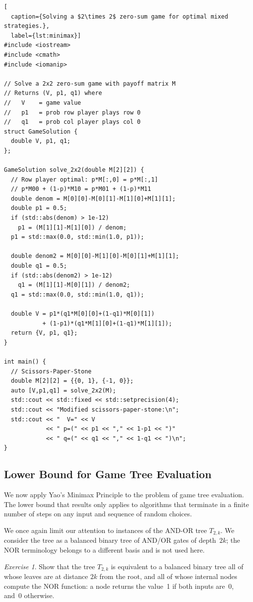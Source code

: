 \documentclass[twoside,12pt]{book}
\theoremstyle{plain}
\theoremstyle{definition}
\theoremstyle{remark}
\newtheorem{exercise}[theorem]{Exercise}
\begin{document}
\begin{lstlisting}[
  caption={Solving a $2\times 2$ zero-sum game for optimal mixed strategies.},
  label={lst:minimax}]
#include <iostream>
#include <cmath>
#include <iomanip>

// Solve a 2x2 zero-sum game with payoff matrix M
// Returns (V, p1, q1) where
//   V    = game value
//   p1   = prob row player plays row 0
//   q1   = prob col player plays col 0
struct GameSolution {
  double V, p1, q1;
};

GameSolution solve_2x2(double M[2][2]) {
  // Row player optimal: p*M[:,0] = p*M[:,1]
  // p*M00 + (1-p)*M10 = p*M01 + (1-p)*M11
  double denom = M[0][0]-M[0][1]-M[1][0]+M[1][1];
  double p1 = 0.5;
  if (std::abs(denom) > 1e-12)
    p1 = (M[1][1]-M[1][0]) / denom;
  p1 = std::max(0.0, std::min(1.0, p1));

  double denom2 = M[0][0]-M[1][0]-M[0][1]+M[1][1];
  double q1 = 0.5;
  if (std::abs(denom2) > 1e-12)
    q1 = (M[1][1]-M[0][1]) / denom2;
  q1 = std::max(0.0, std::min(1.0, q1));

  double V = p1*(q1*M[0][0]+(1-q1)*M[0][1])
           + (1-p1)*(q1*M[1][0]+(1-q1)*M[1][1]);
  return {V, p1, q1};
}

int main() {
  // Scissors-Paper-Stone
  double M[2][2] = {{0, 1}, {-1, 0}};
  auto [V,p1,q1] = solve_2x2(M);
  std::cout << std::fixed << std::setprecision(4);
  std::cout << "Modified scissors-paper-stone:\n";
  std::cout << "  V=" << V
            << " p=(" << p1 << "," << 1-p1 << ")"
            << " q=(" << q1 << "," << 1-q1 << ")\n";
}
\end{lstlisting}

\subsection{Lower Bound for Game Tree Evaluation}

We now apply Yao's Minimax Principle to the problem of game tree evaluation.
The lower bound that results only applies to algorithms that terminate in a
finite number of steps on any input and sequence of random choices.

We once again limit our attention to instances of the AND-OR tree $T_{2,k}$.
We consider the tree as a balanced binary tree of AND/OR gates of depth~$2k$;
the NOR terminology belongs to a different basis and is not used here.

\begin{exercise}
Show that the tree $T_{2,k}$ is equivalent to a balanced binary tree all of
whose leaves are at distance $2k$ from the root, and all of whose internal
nodes compute the NOR function: a node returns the value~1 if both inputs
are~0, and~0 otherwise.
\end{exercise}
\end{document}
